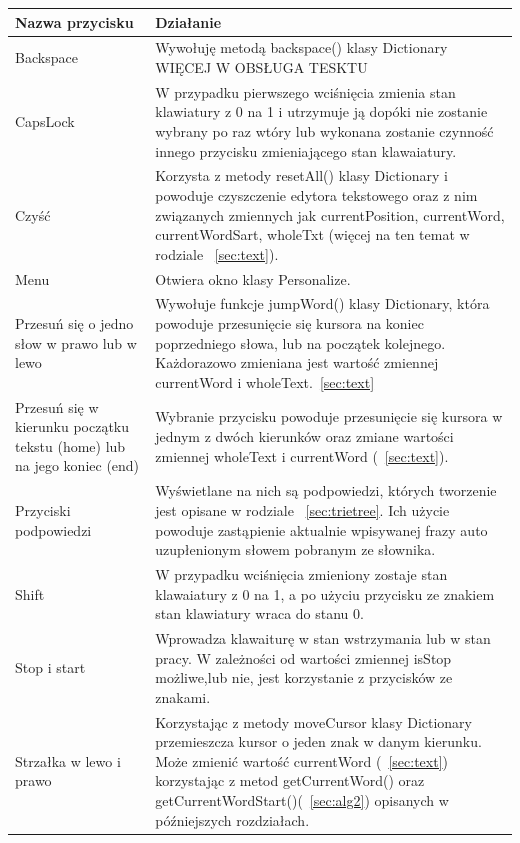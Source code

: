 \documentclass[twoside,a4paper]{book}
\begin{document}
\begin{table}
    \begin{tabular}{|p{4cm}|p{8.5cm}|}
        \hline
    \textbf{Nazwa przycisku} & \textbf{Działanie}\\ \hline
     Backspace & Wywołuję metodą backspace() klasy Dictionary WIĘCEJ W OBSŁUGA TESKTU\\ \hline
    CapsLock & W przypadku pierwszego wciśnięcia zmienia stan klawiatury z 0 na 1 i utrzymuje ją dopóki nie zostanie wybrany po raz wtóry lub wykonana zostanie czynność innego przycisku zmieniającego stan klawaiatury. \\ \hline
 Czyść & Korzysta z metody resetAll() klasy Dictionary i powoduje czyszczenie edytora tekstowego oraz z nim związanych zmiennych jak currentPosition, currentWord, currentWordSart, wholeTxt (więcej na ten temat w rodziale ~\ref{sec:text}).\\ \hline
Menu & Otwiera okno klasy Personalize.\\ \hline
Przesuń się o jedno słow w prawo lub w lewo & Wywołuje funkcje jumpWord() klasy Dictionary, która powoduje przesunięcie się kursora na koniec poprzedniego słowa, lub na początek kolejnego. Każdorazowo zmieniana jest wartość zmiennej currentWord i wholeText.~\ref{sec:text}\\ \hline
 Przesuń się w kierunku początku tekstu (home) lub na jego koniec (end) & Wybranie przycisku powoduje przesunięcie się kursora w jednym z dwóch kierunków oraz zmiane wartości zmiennej wholeText i currentWord (~\ref{sec:text}). \\ \hline
 Przyciski podpowiedzi & Wyświetlane na nich są podpowiedzi, których tworzenie jest opisane w rodziale ~\ref{sec:trietree}. Ich użycie powoduje zastąpienie aktualnie wpisywanej frazy auto uzupłenionym słowem pobranym ze słownika. \\ \hline
  Shift & W przypadku wciśnięcia zmieniony zostaje stan klawaiatury z 0 na 1, a po użyciu przycisku ze znakiem stan klawiatury wraca do stanu 0. \\ \hline
   Stop i start & Wprowadza klawaiturę w stan wstrzymania lub w stan pracy. W zależności od wartości zmiennej isStop możliwe,lub nie, jest korzystanie z przycisków ze znakami.\\ \hline
   Strzałka w lewo i prawo &  Korzystając z metody moveCursor klasy Dictionary przemieszcza kursor o jeden znak w danym kierunku. Może zmienić wartość currentWord (~\ref{sec:text}) korzystając z metod getCurrentWord() oraz getCurrentWordStart()(~\ref{sec:alg2}) opisanych w późniejszych rozdziałach.\\ \hline

\end{tabular}
\end{table}
\end{document}
